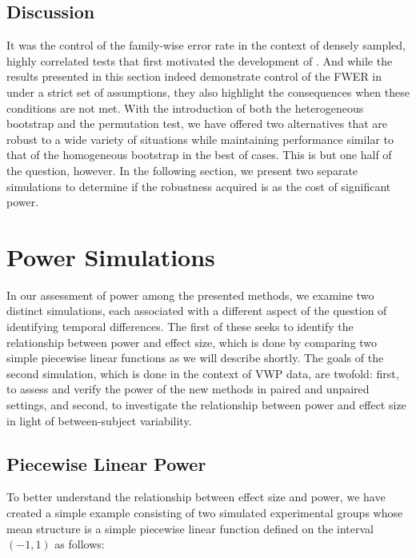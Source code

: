 \subsection{Discussion}


It was the control of the family-wise error rate in the context of densely sampled, highly correlated tests that first motivated the development of . And while the results presented in this section indeed demonstrate control of the FWER in under a strict set of assumptions, they also highlight the consequences when these conditions are not met. With the introduction of both the heterogeneous bootstrap and the permutation test, we have offered two alternatives that are robust to a wide variety of situations while maintaining performance similar to that of the homogeneous bootstrap in the best of cases. This is but one half of the question, however. In the following section, we present two separate simulations to determine if the robustness acquired is as the cost of significant power.



\section{Power Simulations}

In our assessment of power among the presented methods, we examine two distinct simulations, each associated with a different aspect of the question of identifying temporal differences. The first of these seeks to identify the relationship between power and effect size, which is done by comparing two simple piecewise linear functions as we will describe shortly. The goals of the second simulation, which is done in the context of VWP data, are twofold: first, to assess and verify the power of the new methods in paired and unpaired settings, and second, to investigate the relationship between power and effect size in light of between-subject variability.

\subsection{Piecewise Linear Power}

To better understand the relationship between effect size and power, we have created a simple example consisting of two simulated experimental groups whose mean structure is a simple piecewise linear function defined on the interval $(-1, 1)$ as follows:


